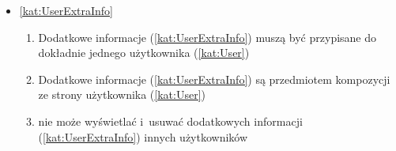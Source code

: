 \begin{itemize}[label={\textbf{Reguły dla}}, wide, labelwidth=!, labelindent=0pt]
    \item\ref{kat:UserExtraInfo}\mynobreakpar
    \begin{enumerate}[label={\textbf{REG/1/\protect\twodigits{\arabic{enumi}}}}, wide, labelwidth=!, align=left, leftmargin=3cm, resume]
        \item Dodatkowe informacje (\ref{kat:UserExtraInfo}) muszą być przypisane do dokładnie jednego użytkownika (\ref{kat:User})
        \item Dodatkowe informacje (\ref{kat:UserExtraInfo}) są przedmiotem kompozycji ze strony użytkownika (\ref{kat:User})
        \item {} nie może wyświetlać i~usuwać dodatkowych informacji (\ref{kat:UserExtraInfo}) innych użytkowników
    \end{enumerate}

\end{itemize}
